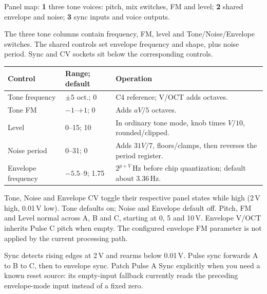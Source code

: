 Panel map: \textbf{1} three tone voices: pitch, mix switches, FM and level;
\textbf{2} shared envelope and noise;
\textbf{3} sync inputs and voice outputs.

The three tone columns contain frequency, FM, level and Tone/Noise/Envelope
switches. The shared controls set envelope frequency and shape, plus noise
period. Sync and CV sockets sit below the corresponding controls.

\begin{tabularx}{\textwidth}{@{}l l X@{}}
\toprule Control & Range; default & Operation \\\midrule
Tone frequency & $\pm5$ oct.; 0 & C4 reference; V/OCT adds octaves. \\
Tone FM & $-1$--$+1$; 0 & Adds $aV/5$ octaves. \\
Level & 0--15; 10 & In ordinary tone mode, knob times $V/10$, rounded/clipped. \\
Noise period & 0--31; 0 & Adds $31V/7$, floors/clamps, then reverses the period register. \\
Envelope frequency & $-5.5$--9; 1.75 & $2^{p+V}$\,Hz before chip quantization; default about 3.36\,Hz. \\
\bottomrule
\end{tabularx}

Tone, Noise and Envelope CV toggle their respective panel states while high
(2\,V high, 0.01\,V low). Tone defaults on; Noise and Envelope default off.
Pitch, FM and Level normal across A, B and C, starting at 0, 5 and 10\,V.
Envelope V/OCT inherits Pulse C pitch when empty. The configured envelope
FM parameter is not applied by the current processing path.

Sync detects rising edges at 2\,V and rearms below 0.01\,V. Pulse sync forwards
A to B to C, then to envelope sync. Patch Pulse A Sync explicitly when you
need a known reset source: its empty-input fallback currently reads the
preceding envelope-mode input instead of a fixed zero.

